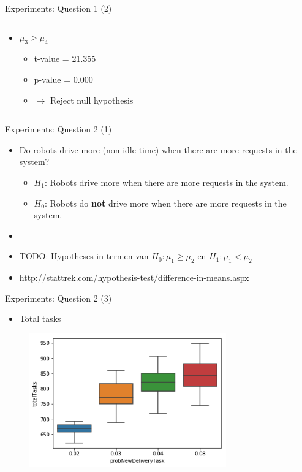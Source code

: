 \begin{frame}{Experiments: Question 1 (2)}
\begin{columns}
\begin{column}{0.5\textwidth}
\begin{itemize}
            \item $\mu_3 \geq \mu_4$
                \begin{itemize}
	                \item t-value = 21.355
	                \item p-value = 0.000
                    \item $\rightarrow$ Reject null hypothesis
                \end{itemize}
        \end{itemize}
    \end{column}

    \end{columns}
\end{frame}


\begin{frame}{Experiments: Question 2 (1)}
    \begin{itemize}
        \item Do robots drive more (non-idle time) when there are more requests in the system?
        \begin{itemize}
                \item $H_1$: Robots drive more when there are more requests in the system.
                \item $H_0$: Robots do \textbf{not} drive more when there are more requests in the system.
        \end{itemize}

        \item[]
        \item TODO: Hypotheses in termen van $H_0: \mu_1 \geq \mu_2$ en $H_1: \mu_1 < \mu_2$
        \item http://stattrek.com/hypothesis-test/difference-in-means.aspx
    \end{itemize}
\end{frame}

\begin{frame}{Experiments: Question 2 (3)}
    \begin{itemize}
        \item Total tasks
    \end{itemize}

    \begin{figure}[!hbt]
        \centering
        \includegraphics[width=8.5cm]{imgs/question2-plot3}
    \end{figure}
\end{frame}

